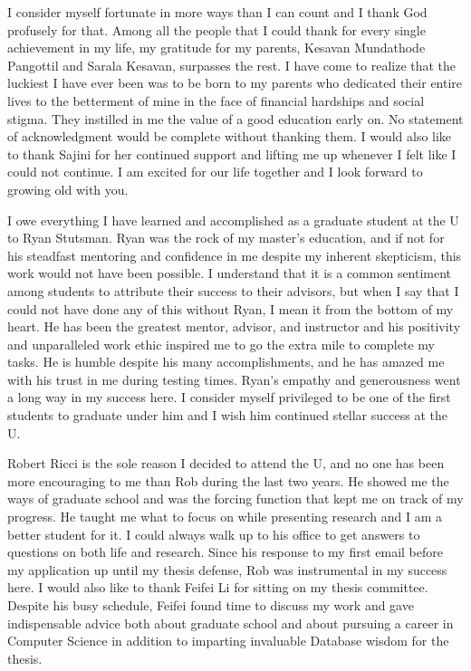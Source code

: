 I consider myself fortunate in more ways than I can count and I thank God profusely for that. 
Among all the people that I could thank for every single achievement in my life, my gratitude for my parents, Kesavan Mundathode Pangottil and Sarala Kesavan, surpasses the rest. 
I have come to realize that the luckiest I have ever been was to be born to my parents who dedicated their entire lives to the betterment of mine in the face of financial hardships and social stigma. 
They instilled in me the value of a good education early on. No statement of acknowledgment would be complete without thanking them. I would also like to thank Sajini for her continued support and lifting 
me up whenever I felt like I could not continue. I am excited for our life together and I look forward to growing old with you.

I owe everything I have learned and accomplished as a graduate student at the U to Ryan Stutsman. 
Ryan was the rock of my master's education, and if not for his steadfast mentoring and confidence in me despite my inherent skepticism, this work would not have been possible. 
I understand that it is a common sentiment among students to attribute their success to their advisors, but when I say that I could not have done any of this without Ryan, I mean it from the bottom of my heart. 
He has been the greatest mentor, advisor, and instructor and his positivity and unparalleled work ethic inspired me to go the extra mile to complete my tasks. 
He is humble despite his many accomplishments, and he has amazed me with his trust in me during testing times. 
Ryan's empathy and generousness went a long way in my success here. 
I consider myself privileged to be one of the first students to graduate under him and I wish him continued stellar success at the U.

Robert Ricci is the sole reason I decided to attend the U, and no one has been more \linebreak encouraging to me than Rob during the last two years.
He showed me the ways of \linebreak graduate school and was the forcing function that kept me on track of my progress. 
He taught me what to focus on while presenting research and I am a better student for it.\linebreak 
I could always walk up to his office to get answers to questions on both life and research. 
Since his response to my first email before my application up until my thesis defense, \linebreak Rob was instrumental in my success here. 
I would also like to thank Feifei Li for sitting on my thesis committee. Despite his busy schedule, Feifei found time to discuss my work and gave indispensable advice both about graduate school and about pursuing a career in Computer Science in addition to imparting invaluable Database wisdom for the thesis.


